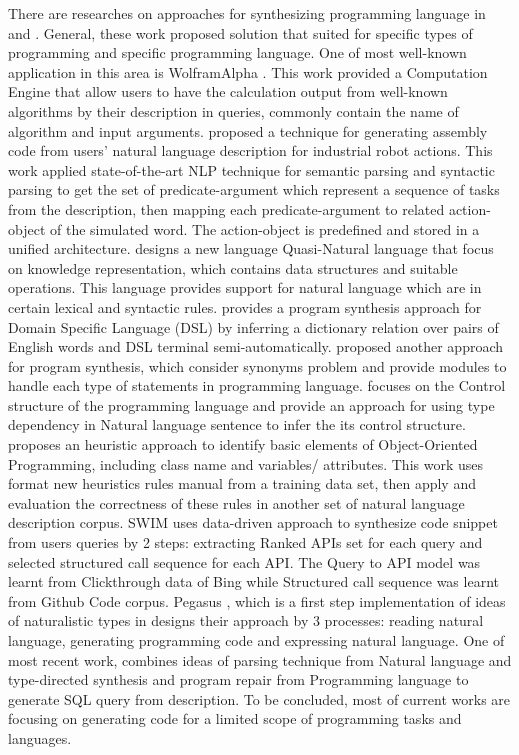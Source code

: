\documentclass[english]{lipics-v2016}
\begin{document}
There are researches on approaches for synthesizing programming language in \cite{p4} \cite{p11} \cite{p13}  \cite{p15} \cite{p17} \cite{p18} \cite{p19} \cite{p23} \cite{p26} and  \cite{p3}. General, these work proposed solution that suited for specific types of programming and specific programming language. One of most well-known application in this area is WolframAlpha \cite{p4}. This work provided a Computation Engine that allow users to have the calculation output from well-known algorithms by their description in queries, commonly contain the name of algorithm and input arguments. \cite{p11} proposed a technique for generating assembly code from users’ natural language description for industrial robot actions. This work applied state-of-the-art NLP technique for semantic parsing and syntactic parsing to get the set of predicate-argument  which represent a sequence of tasks from the description, then mapping each predicate-argument to related action-object of the simulated word. The action-object is predefined and stored in a unified architecture. \cite{p13} designs a new language Quasi-Natural language that focus on knowledge representation, which contains data structures and suitable operations. This language provides support for natural language which are in certain lexical and syntactic rules. \cite{p14} provides a program synthesis approach for Domain Specific Language (DSL)  by inferring a dictionary relation over pairs of English words and DSL terminal semi-automatically. \cite{p15} proposed another approach for program synthesis, which consider synonyms problem and provide modules to handle each type of statements in programming language. \cite{p17} focuses on the Control structure of the programming language and provide an approach for using type dependency in Natural language sentence to infer the its control structure. \cite{p18} proposes an heuristic approach to identify basic elements of Object-Oriented Programming, including class name and variables/ attributes. This work uses format new heuristics rules manual from a training data set, then apply and evaluation the correctness of these rules in another set of natural language description corpus. SWIM \cite{p19} uses data-driven approach to synthesize code snippet from users queries by 2 steps: extracting Ranked APIs set for each query and selected structured call sequence for each API. The Query to API model was learnt from Clickthrough data of Bing while Structured call sequence was learnt from Github Code corpus. Pegasus \cite{p26}, which is a first step implementation of ideas of naturalistic types in  \cite{p25} designs their approach by 3 processes: reading natural language, generating programming code and expressing natural language. One of most recent work, \cite{p3} combines ideas of parsing technique from Natural language and type-directed synthesis and program repair from Programming language to generate SQL query from description. To be concluded, most of current works are focusing on generating code for a limited scope of programming tasks and languages.
\end{document}
